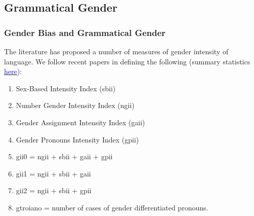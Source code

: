 \documentclass[10pt,letterpaper,subeqn]{beamer}
\begin{document}
\subsection{Grammatical Gender}
\begin{frame}[label=GenderLanguage]
\frametitle{Gender Bias and Grammatical Gender}
The literature has proposed a number of measures of gender intensity of language.
We follow recent papers in defining the following (summary statistics \hyperlink{GenderLanguageSum}{\textcolor{blue}{here}}): \vspace{4mm}
\begin{enumerate}
\item Sex-Based Intensity Index (sbii) 
\item Number Gender Intensity Index (ngii)
\item Gender Assignment Intensity Index (gaii) 
\item Gender Pronouns Intensity Index (gpii) 
\item gii0 = ngii + sbii + gaii + gpii
\item gii1 = ngii + sbii + gaii
\item gii2 = ngii + sbii + gpii
\item gtroiano = number of cases of gender differentiated pronouns.
\end{enumerate}
\end{frame}
\end{document}
